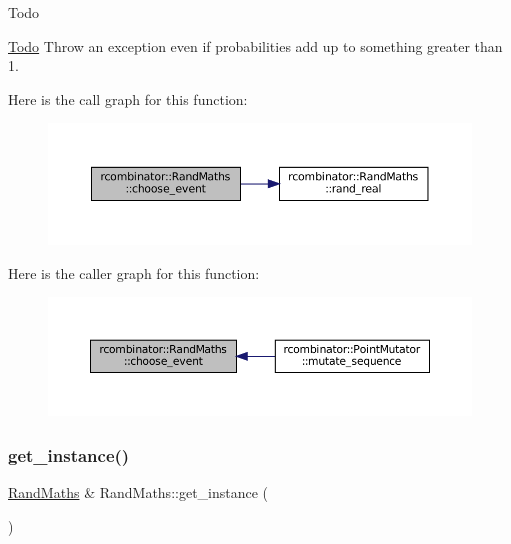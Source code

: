 \begin{DoxyRefDesc}{Todo}
\item[\mbox{\hyperlink{todo__todo000009}{Todo}}]Throw an exception even if probabilities add up to something greater than 1. \end{DoxyRefDesc}
Here is the call graph for this function\+:
\nopagebreak
\begin{figure}[H]
\begin{center}
\leavevmode
\includegraphics[width=350pt]{classrcombinator_1_1RandMaths_afbc0d35bd9744ecab1983914ac32d68c_cgraph}
\end{center}
\end{figure}
Here is the caller graph for this function\+:\nopagebreak
\begin{figure}[H]
\begin{center}
\leavevmode
\includegraphics[width=350pt]{classrcombinator_1_1RandMaths_afbc0d35bd9744ecab1983914ac32d68c_icgraph}
\end{center}
\end{figure}
\mbox{\label{classrcombinator_1_1RandMaths_ae54dee1a16fb0e275e1624ccaa7dc87e}} 
\subsubsection{\texorpdfstring{get\+\_\+instance()}{get\_instance()}}
{\footnotesize\ttfamily \mbox{\hyperlink{classrcombinator_1_1RandMaths}{Rand\+Maths}} \& Rand\+Maths\+::get\+\_\+instance (\begin{DoxyParamCaption}{ }\end{DoxyParamCaption})\hspace{0.3cm}{\ttfamily [static]}}



